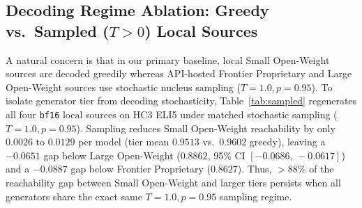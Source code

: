 \documentclass[11pt]{article}
\begin{document}
\subsection{Decoding Regime Ablation: Greedy vs.\ Sampled ($T>0$) Local Sources}

\begin{table}[t]
\centering
\small
{}
\caption{Stochastic-regeneration decoding ablation on HC3 ELI5 (realistic $p=0.99, K=100$, detokenized human reference). Local open-weight sources are regenerated using ancestral nucleus sampling ($T=1.0, p=0.95$) matched to the API sampling regime of Frontier Proprietary and Large Open-Weight models.}
\label{tab:sampled}
\end{table}

A natural concern is that in our primary baseline, local Small Open-Weight sources are decoded greedily whereas API-hosted Frontier Proprietary and Large Open-Weight sources use stochastic nucleus sampling ($T=1.0, p=0.95$). To isolate generator tier from decoding stochasticity, Table~\ref{tab:sampled} regenerates all four \texttt{bf16} local sources on HC3 ELI5 under matched stochastic sampling ($T=1.0, p=0.95$). Sampling reduces Small Open-Weight reachability by only $0.0026$ to $0.0129$ per model (tier mean $0.9513$ vs.\ $0.9602$ greedy), leaving a $-0.0651$ gap below Large Open-Weight ($0.8862$, 95\% CI $[-0.0686,\,-0.0617]$) and a $-0.0887$ gap below Frontier Proprietary ($0.8627$). Thus, $>88\%$ of the reachability gap between Small Open-Weight and larger tiers persists when all generators share the exact same $T=1.0, p=0.95$ sampling regime.
\end{document}
